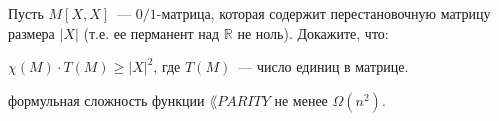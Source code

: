 Пусть $M[X, X]$~--- $0 / 1$-матрица, которая содержит перестановочную матрицу размера $|X|$ (т.е. ее
перманент над $\mathbb{R}$ не ноль). Докажите, что:
\begin{enumcyr}
    \item $\chi(M) \cdot T(M) \ge |X|^2$, где $T(M)$~--- число единиц в матрице.
    \item формульная сложность функции $\lang{PARITY}$ не менее $\Omega(n^2)$.
\end{enumcyr}